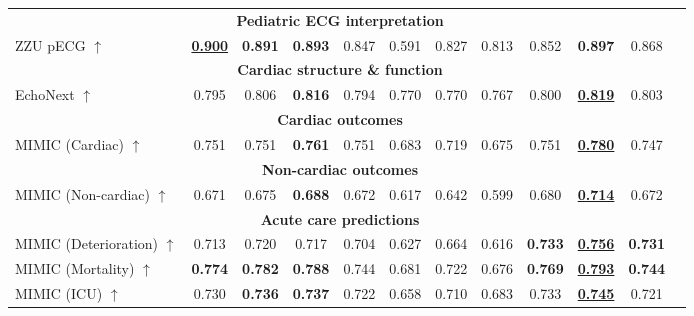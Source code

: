 \documentclass{article}
\begin{document}
\begin{table}[t]
\begin{tabular}{lccccccccccc}
                    \multicolumn{11}{c}{\textbf{Pediatric ECG interpretation }} \\
                    ZZU pECG $\uparrow$ & \underline{\textbf{0.900}} & \textbf{0.891} & \textbf{0.893} & 0.847 & 0.591 & 0.827 & 0.813 &  0.852 & \textbf{0.897} & 0.868 \\
                    \midrule
        
                    \multicolumn{11}{c}{\textbf{Cardiac structure \& function }} \\
                    EchoNext $\uparrow$ & 0.795 & 0.806 & \textbf{0.816} & 0.794 & 0.770 & 0.770 & 0.767 &  0.800 & \underline{\textbf{0.819}} & 0.803 \\
                    \midrule
        
                    \multicolumn{11}{c}{\textbf{Cardiac outcomes}} \\
                    MIMIC (Cardiac) $\uparrow$ & 0.751 & 0.751 & \textbf{0.761} & 0.751 & 0.683 & 0.719 & 0.675 & 0.751 & \textbf{\underline{0.780}} & 0.747 \\
                    \midrule
                    
                    \multicolumn{11}{c}{\textbf{Non-cardiac outcomes}} \\
                    MIMIC (Non-cardiac) $\uparrow$ & 0.671 & 0.675 & \textbf{0.688} & 0.672 & 0.617 & 0.642 & 0.599 & 0.680 & \textbf{\underline{0.714}} & 0.672 \\
                    \midrule
                    
                    \multicolumn{11}{c}{\textbf{Acute care predictions}} \\
                    MIMIC (Deterioration) $\uparrow$ & 0.713 & 0.720 & 0.717 & 0.704 & 0.627 & 0.664 & 0.616 & \textbf{0.733} & \textbf{\underline{0.756}} & \textbf{0.731} \\
                    MIMIC (Mortality) $\uparrow$ & \textbf{0.774} & \textbf{0.782} & \textbf{0.788} & 0.744 & 0.681 & 0.722 & 0.676 & \textbf{0.769} & \textbf{\underline{0.793}} & \textbf{0.744} \\
                    MIMIC (ICU) $\uparrow$ & 0.730 & \textbf{0.736} & \textbf{0.737} & 0.722 & 0.658 & 0.710 & 0.683 & 0.733 & \textbf{\underline{0.745}} & 0.721 \\
                    \midrule
                    

\end{tabular}
\end{table}
\end{document}
